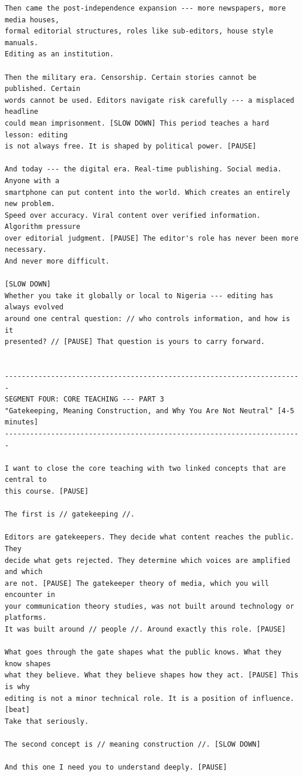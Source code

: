 {\begin{Verbatim}
Then came the post-independence expansion --- more newspapers, more media houses,
formal editorial structures, roles like sub-editors, house style manuals.
Editing as an institution.

Then the military era. Censorship. Certain stories cannot be published. Certain
words cannot be used. Editors navigate risk carefully --- a misplaced headline
could mean imprisonment. [SLOW DOWN] This period teaches a hard lesson: editing
is not always free. It is shaped by political power. [PAUSE]

And today --- the digital era. Real-time publishing. Social media. Anyone with a
smartphone can put content into the world. Which creates an entirely new problem.
Speed over accuracy. Viral content over verified information. Algorithm pressure
over editorial judgment. [PAUSE] The editor's role has never been more necessary.
And never more difficult.

[SLOW DOWN]
Whether you take it globally or local to Nigeria --- editing has always evolved
around one central question: // who controls information, and how is it
presented? // [PAUSE] That question is yours to carry forward.


-----------------------------------------------------------------------
SEGMENT FOUR: CORE TEACHING --- PART 3
"Gatekeeping, Meaning Construction, and Why You Are Not Neutral" [4-5 minutes]
-----------------------------------------------------------------------

I want to close the core teaching with two linked concepts that are central to
this course. [PAUSE]

The first is // gatekeeping //.

Editors are gatekeepers. They decide what content reaches the public. They
decide what gets rejected. They determine which voices are amplified and which
are not. [PAUSE] The gatekeeper theory of media, which you will encounter in
your communication theory studies, was not built around technology or platforms.
It was built around // people //. Around exactly this role. [PAUSE]

What goes through the gate shapes what the public knows. What they know shapes
what they believe. What they believe shapes how they act. [PAUSE] This is why
editing is not a minor technical role. It is a position of influence. [beat]
Take that seriously.

The second concept is // meaning construction //. [SLOW DOWN]

And this one I need you to understand deeply. [PAUSE]


\end{Verbatim}}
